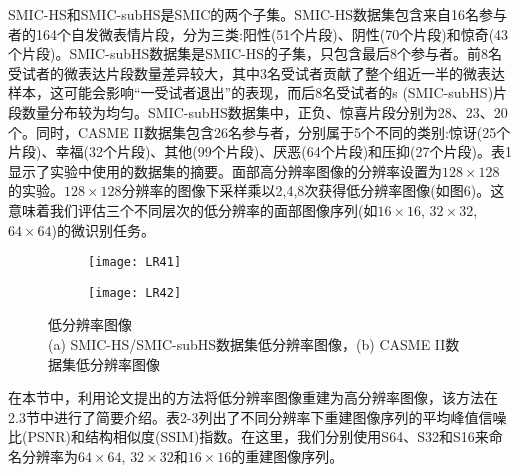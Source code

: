 SMIC-HS和SMIC-subHS是SMIC的两个子集。SMIC-HS数据集包含来自16名参与者的164个自发微表情片段，分为三类:阳性(51个片段)、阴性(70个片段)和惊奇(43个片段)。SMIC-subHS数据集是SMIC-HS的子集，只包含最后8个参与者。前8名受试者的微表达片段数量差异较大，其中3名受试者贡献了整个组近一半的微表达样本，这可能会影响“一受试者退出”的表现，而后8名受试者的s (SMIC-subHS)片段数量分布较为均匀。SMIC-subHS数据集中，正负、惊喜片段分别为28、23、20个。同时，CASME II数据集包含26名参与者，分别属于5个不同的类别:惊讶(25个片段)、幸福(32个片段)、其他(99个片段)、厌恶(64个片段)和压抑(27个片段)。表1显示了实验中使用的数据集的摘要。面部高分辨率图像的分辨率设置为$ 128 \times 128 $的实验。$ 128 \times 128 $分辨率的图像下采样乘以2,4,8次获得低分辨率图像(如图6)。这意味着我们评估三个不同层次的低分辨率的面部图像序列(如$ 16 \times 16 $, $ 32 \times 32 $, $ 64 \times 64 $)的微识别任务。

\begin{figure}[!htb]
    \centering
    \begin{subfigure}[b]{0.35\textwidth}
      \texttt{[image: LR41]}
      \caption{}
    \end{subfigure}%
    \quad
    \begin{subfigure}[b]{0.35\textwidth}
      \texttt{[image: LR42]}
      \caption{}
    \end{subfigure}
    \caption{低分辨率图像\\ \footnotesize \textmd{(a) SMIC-HS/SMIC-subHS数据集低分辨率图像，(b) CASME II数据集低分辨率图像}}
    \label{fig14}
\end{figure}

在本节中，利用论文提出的方法将低分辨率图像重建为高分辨率图像，该方法在2.3节中进行了简要介绍。表2-3列出了不同分辨率下重建图像序列的平均峰值信噪比(PSNR)和结构相似度(SSIM)指数。在这里，我们分别使用S64、S32和S16来命名分辨率为$ 64 \times 64 $, $ 32 \times 32 $和$ 16 \times 16 $的重建图像序列。

\begin{table}[!htb]
\centering
\caption{重建图像序列的平均PSNR(dB)指标}
\label{tab5}
\end{table}

